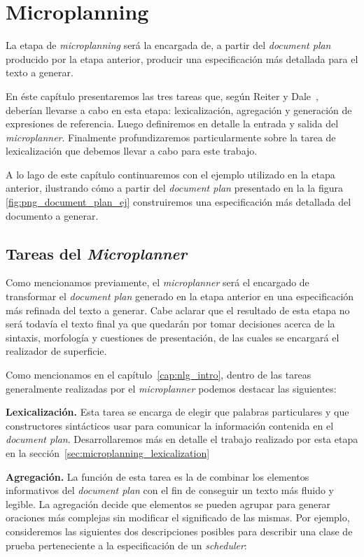 \chapter{Microplanning}
\label{cap:microplanning}

La etapa de \textit{microplanning} será la encargada de, a partir del \textit{document plan} producido por la etapa anterior, producir una especificación más detallada para el texto a generar. 

En éste capítulo presentaremos las tres tareas que, según Reiter y Dale~\cite{reiter_dale}, deberían llevarse a cabo en esta etapa: lexicalización, agregación y generación de expresiones de referencia. Luego definiremos en detalle la entrada y salida del \textit{microplanner}. Finalmente profundizaremos particularmente sobre la tarea de lexicalización que debemos llevar a cabo para este trabajo.

A lo lago de este capítulo continuaremos con el ejemplo utilizado en la etapa anterior, ilustrando cómo a partir del \textit{document plan} presentado en la la figura \ref{fig:png_document_plan_ej} construiremos una especificación más detallada del documento a generar.

\section{Tareas del \textit{Microplanner}}

Como mencionamos previamente, el \textit{microplanner} será el encargado de transformar el \textit{document plan} generado en la etapa anterior en una especificación más refinada del texto a generar. Cabe aclarar que el resultado de esta etapa no será todavía el texto final ya que quedarán por tomar decisiones acerca de la sintaxis, morfología y cuestiones de presentación, de las cuales se encargará el realizador de superficie.

Como mencionamos en el capítulo~\ref{cap:nlg_intro}, dentro de las tareas generalmente realizadas por el \emph{microplanner} podemos destacar las siguientes:

\medskip
\noindent
\textbf{Lexicalización.} Esta tarea se encarga de elegir que palabras particulares y que constructores sintácticos usar para comunicar la información contenida en el \textit{document plan}. Desarrollaremos más en detalle el trabajo realizado por esta etapa en la sección~\ref{sec:microplanning_lexicalization}


\medskip
\noindent
\textbf{Agregación.} La función de esta tarea es la de combinar los elementos informativos del \emph{document plan} con el fin de conseguir un texto más fluido y legible. La agregación decide que elementos se pueden agrupar para generar oraciones más complejas sin modificar el significado de las mismas. Por ejemplo, consideremos las siguientes dos descripciones posibles para describir una clase de prueba perteneciente a la especificación de un \emph{scheduler}:

